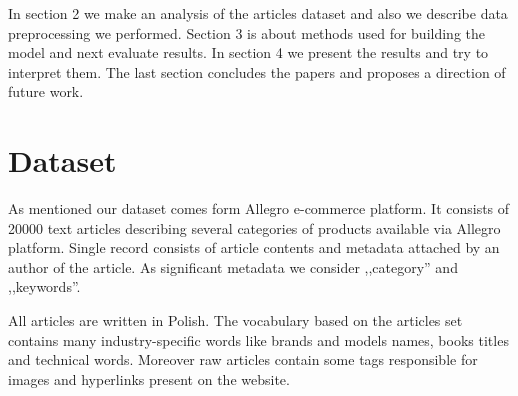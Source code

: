 \documentclass[twoside,twocolumn]{article}
\begin{document}
	In section 2 we make an analysis of the articles dataset and also we describe data preprocessing we performed. Section 3 is about methods used for building the model and next evaluate results. In section 4 we present the results and try to interpret them. The last section concludes the papers and proposes a direction of future work.
	\section{Dataset}
	
	As mentioned our dataset comes form Allegro e-commerce platform. It consists of 20000 text articles describing several categories of products available via Allegro platform. Single record consists of article contents and metadata attached by an author of the article. As significant metadata we consider ,,category'' and ,,keywords''.
	
	
	All articles are written in Polish. The vocabulary based on the articles set contains many industry-specific words like brands and models names, books titles and technical words. Moreover raw articles contain some tags responsible for images and hyperlinks present on the website.
	
\end{document}
